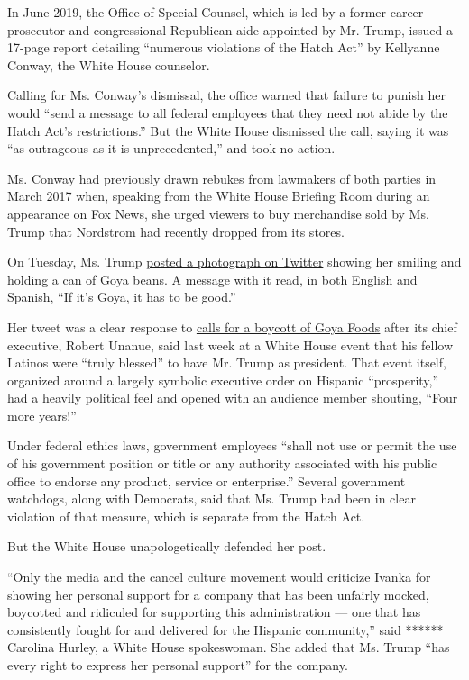 In June 2019, the Office of Special Counsel, which is led by a former
career prosecutor and congressional Republican aide appointed by Mr.
Trump, issued a 17-page report detailing ``numerous violations of the
Hatch Act'' by Kellyanne Conway, the White House counselor.

Calling for Ms. Conway's dismissal, the office warned that failure to
punish her would ``send a message to all federal employees that they
need not abide by the Hatch Act's restrictions.'' But the White House
dismissed the call, saying it was ``as outrageous as it is
unprecedented,'' and took no action.

Ms. Conway had previously drawn rebukes from lawmakers of both parties
in March 2017 when, speaking from the White House Briefing Room during
an appearance on Fox News, she urged viewers to buy merchandise sold by
Ms. Trump that Nordstrom had recently dropped from its stores.

On Tuesday, Ms. Trump
\href{https://twitter.com/IvankaTrump/status/1283221019684110337?ref_src=twsrc\%5Etfw}{posted
a photograph on Twitter} showing her smiling and holding a can of Goya
beans. A message with it read, in both English and Spanish, ``If it's
Goya, it has to be good.''

Her tweet was a clear response to
\href{https://www.nytimes.com/2020/07/10/business/goya-boycott.html?searchResultPosition=1}{calls
for a boycott of Goya Foods} after its chief executive, Robert Unanue,
said last week at a White House event that his fellow Latinos were
``truly blessed'' to have Mr. Trump as president. That event itself,
organized around a largely symbolic executive order on Hispanic
``prosperity,'' had a heavily political feel and opened with an audience
member shouting, ``Four more years!''

Under federal ethics laws, government employees ``shall not use or
permit the use of his government position or title or any authority
associated with his public office to endorse any product, service or
enterprise.'' Several government watchdogs, along with Democrats, said
that Ms. Trump had been in clear violation of that measure, which is
separate from the Hatch Act.

But the White House unapologetically defended her post.

``Only the media and the cancel culture movement would criticize Ivanka
for showing her personal support for a company that has been unfairly
mocked, boycotted and ridiculed for supporting this administration ---
one that has consistently fought for and delivered for the Hispanic
community,'' said ****** Carolina Hurley, a White House spokeswoman. She
added that Ms. Trump ``has every right to express her personal support''
for the company.

